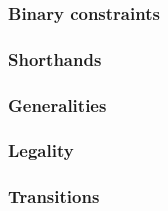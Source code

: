 \subsubsection{Binary constraints}         \label{hub: system: transaction phase flags: binarities}        
\subsubsection{Shorthands}                 \label{hub: system: transaction phase flags: shorthands}        
\subsubsection{Generalities}               \label{hub: system: transaction phase flags: generalities}      
\subsubsection{Legality}                   \label{hub: system: transaction phase flags: legality}          
\subsubsection{Transitions}                \label{hub: system: transaction phase flags: transitions}       

